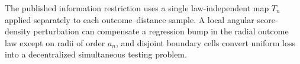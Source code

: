 The published information restriction uses a single law-independent map \(T_n\) applied separately to each outcome--distance sample.  A local angular score-density perturbation can compensate a regression bump in the radial outcome law except on radii of order \(a_n\), and disjoint boundary cells convert uniform loss into a decentralized simultaneous testing problem.